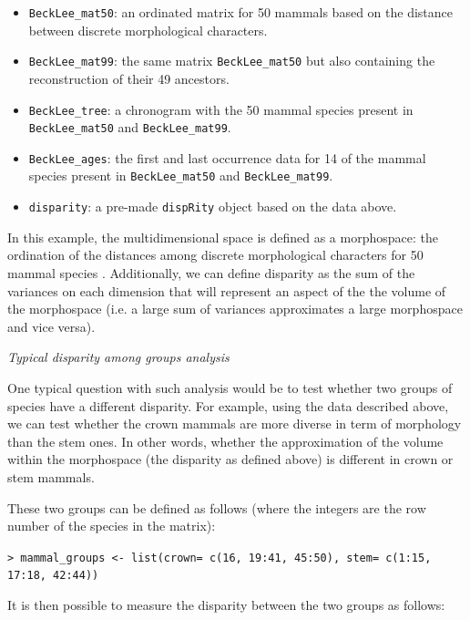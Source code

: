\documentclass[12pt,letterpaper]{article}
\renewcommand{\subsection}[1]{%
\bigskip
\begin{center}
\begin{large}
\normalfont\itshape #1
\end{large}
\end{center}}
\newcommand{\disp}{\texttt{dispRity} }
\begin{document}
\begin{itemize}
    \item \texttt{BeckLee\_mat50}: an ordinated matrix for 50 mammals based on the distance between discrete morphological characters.
    \item \texttt{BeckLee\_mat99}: the same matrix \texttt{BeckLee\_mat50} but also containing the reconstruction of their 49 ancestors.
    \item \texttt{BeckLee\_tree}: a chronogram with the 50 mammal species present in \texttt{BeckLee\_mat50} and \texttt{BeckLee\_mat99}.
    \item \texttt{BeckLee\_ages}: the first and last occurrence data for 14 of the mammal species present in \texttt{BeckLee\_mat50} and \texttt{BeckLee\_mat99}.
    \item \texttt{disparity}: a pre-made \disp object based on the data above.
\end{itemize}

In this example, the multidimensional space is defined as a morphospace: the ordination of the distances among discrete morphological characters for 50 mammal species \citep[from][]{beckancient2014}.
Additionally, we can define disparity as the sum of the variances on each dimension \citep{Wills1994} that will represent an aspect of the the volume of the morphospace (i.e. a large sum of variances approximates a large morphospace and vice versa).

\subsection{Typical disparity among groups analysis}
One typical question with such analysis would be to test whether two groups of species have a different disparity.
For example, using the data described above, we can test whether the crown mammals are more diverse in term of morphology than the stem ones.
In other words, whether the approximation of the volume within the morphospace (the disparity as defined above) is different in crown or stem mammals.

\noindent These two groups can be defined as follows (where the integers are the row number of the species in the matrix):

\noindent \texttt{> mammal\_groups <- list(\textquotedbl crown\textquotedbl = c(16, 19:41, 45:50), \textquotedbl stem\textquotedbl = c(1:15, 17:18, 42:44))}

\noindent It is then possible to measure the disparity between the two groups as follows:
\end{document}
